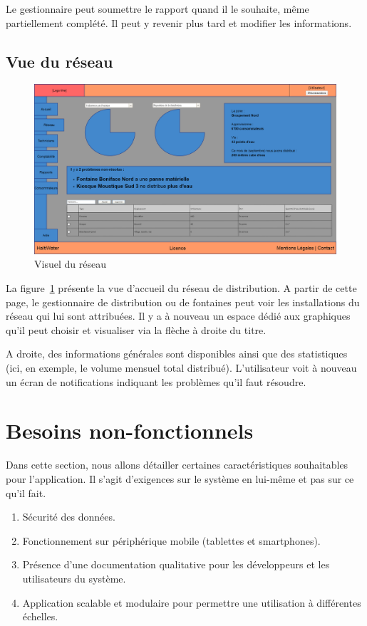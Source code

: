 \documentclass[a4paper, 11pt]{article}
\begin{document}
    Le gestionnaire peut soumettre le rapport quand il le souhaite, même partiellement complété. Il peut y revenir plus tard et modifier les informations.

  \subsection{Vue du réseau}
    \begin{figure}[H]
        \centering
        \includegraphics[width=.8\textwidth]{Cahier_des_Charges/reseau}
        \caption{Visuel du réseau}
        \label{fig:network}
    \end{figure}
    La figure~\ref{fig:network} présente la vue d'accueil du réseau de distribution. A partir de cette page, le gestionnaire de distribution ou de fontaines peut voir les installations du réseau qui lui sont attribuées. Il y a à nouveau un espace dédié aux graphiques qu'il peut choisir et visualiser via la flèche à droite du titre.

    A droite, des informations générales sont disponibles ainsi que des statistiques (ici, en exemple, le volume mensuel total distribué).
    L'utilisateur voit à nouveau un écran de notifications indiquant les problèmes qu'il faut résoudre.

\section{Besoins non-fonctionnels}
Dans cette section, nous allons détailler certaines caractéristiques souhaitables pour l'application. Il s'agit d'exigences sur le système en lui-même et pas sur ce qu'il fait.
\begin{enumerate}
  \item Sécurité des données.
  \item Fonctionnement sur périphérique mobile (tablettes et smartphones).
  \item Présence d'une documentation qualitative pour les développeurs et les utilisateurs du système.
  \item Application scalable et modulaire pour permettre une utilisation à différentes échelles.
\end{enumerate}
\end{document}

